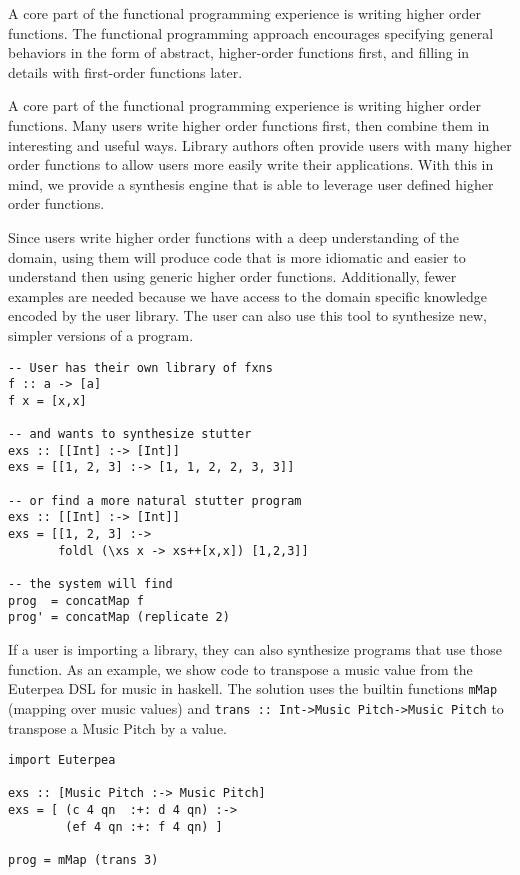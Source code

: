 A core part of the functional programming experience is writing higher order functions. The functional programming approach encourages specifying general behaviors in the form of abstract, higher-order functions first, and filling in details with first-order functions later.

A core part of the functional programming experience is writing higher order functions. Many users write higher order functions first, then combine them in interesting and useful ways. Library authors often provide users with many higher order functions to allow users more easily write their applications. With this in mind, we provide a synthesis engine that is able to leverage user defined higher order functions.

Since users write higher order functions with a deep understanding of the domain, using them will produce code that is more idiomatic and easier to understand then using generic higher order functions. Additionally, fewer examples are needed because we have access to the domain specific knowledge encoded by the user library. The user can also use this tool to synthesize new, simpler versions of a program. 

\begin{lstlisting}
-- User has their own library of fxns
f :: a -> [a]
f x = [x,x]

-- and wants to synthesize stutter
exs :: [[Int] :-> [Int]]
exs = [[1, 2, 3] :-> [1, 1, 2, 2, 3, 3]]

-- or find a more natural stutter program
exs :: [[Int] :-> [Int]]
exs = [[1, 2, 3] :->
       foldl (\xs x -> xs++[x,x]) [1,2,3]]
      
-- the system will find
prog  = concatMap f
prog' = concatMap (replicate 2) 
\end{lstlisting}



If a user is importing a library, they can also synthesize programs that use those function. As an example, we show code to transpose a music value from the Euterpea DSL for music in haskell. The solution uses the builtin functions \texttt{mMap} (mapping over music values) and \texttt{trans :: Int->Music Pitch->Music Pitch} to transpose a Music Pitch by a value.

\begin{lstlisting}
import Euterpea

exs :: [Music Pitch :-> Music Pitch]
exs = [ (c 4 qn  :+: d 4 qn) :->
        (ef 4 qn :+: f 4 qn) ]
        
prog = mMap (trans 3)
\end{lstlisting}
